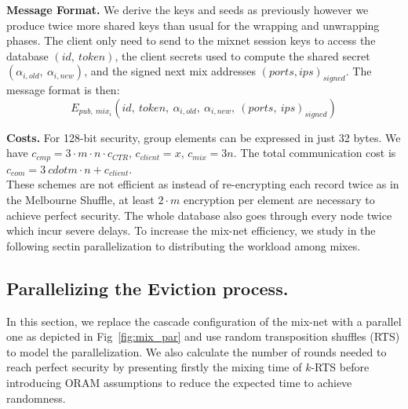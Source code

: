 \documentclass[USenglish,oneside,twocolumn]{article}
\begin{document}
%
\noindent\textbf{Message Format.}
We derive the keys and seeds as previously however we produce twice more shared keys than usual for the wrapping and unwrapping phases. 
The client only need to send to the mixnet session keys to access the database $(id,\ token)$, the client secrets used to compute the shared secret $( \alpha_{i,old},\ \alpha_{i,new} )$, and the signed next mix addresses $(ports,ips)_{signed}$.
The message format is then: $$E_{pub,\ mix_i}\left(id,\ token,\ \alpha_{i,old},\ \alpha_{i,new},\ (ports,\ ips)_{signed} \right)$$ 


\noindent\textbf{Costs.} For 128-bit security, group elements can be expressed in just 32 bytes. We have $c_{cmp} = 3 \cdot m \cdot n \cdot c_{CTR} $, $c_{client}=  x$, $c_{mix}=3n$. The total communication cost is $c_{com}=3 \ cdot m \cdot n + c_{client}$.\\


These schemes are not efficient as instead of re-encrypting each record twice as in the Melbourne Shuffle, at least $2\cdot m$ encryption per element are necessary to achieve perfect security. The whole database also goes through every node twice which incur severe delays. To increase the mix-net efficiency, we study in the following sectin parallelization to distributing the workload among mixes.
% 
\subsection{Parallelizing the Eviction process.}\label{Parallel}
In this section, we replace the cascade configuration of the mix-net with a parallel one as depicted in Fig~\ref{fig:mix_par} and use random transposition shuffles (RTS) to model the parallelization. We also calculate the number of rounds needed to reach perfect security by presenting firstly the mixing time of $k$-RTS before introducing ORAM assumptions to reduce the expected time to achieve randomness.
\end{document}

